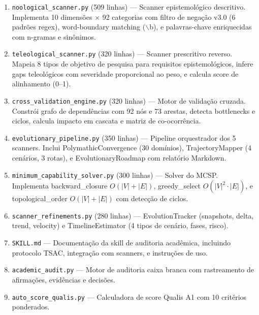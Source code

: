 \begin{enumerate}
  \item \texttt{noological\_scanner.py} (509 linhas) --- Scanner epistemológico descritivo. Implementa 10 dimensões $\times$ 92 categorias com filtro de negação v3.0 (6 padrões regex), word-boundary matching ($\backslash$b), e palavras-chave enriquecidas com n-gramas e sinônimos.
  \item \texttt{teleological\_scanner.py} (320 linhas) --- Scanner prescritivo reverso. Mapeia 8 tipos de objetivo de pesquisa para requisitos epistemológicos, infere gaps teleológicos com severidade proporcional ao peso, e calcula score de alinhamento (0--1).
  \item \texttt{cross\_validation\_engine.py} (320 linhas) --- Motor de validação cruzada. Constrói grafo de dependências com 92 nós e 73 arestas, detecta bottlenecks e ciclos, calcula impacto em cascata e matriz de co-ocorrência.
  \item \texttt{evolutionary\_pipeline.py} (350 linhas) --- Pipeline orquestrador dos 5 scanners. Inclui PolymathicConvergence (30 domínios), TrajectoryMapper (4 cenários, 3 rotas), e EvolutionaryRoadmap com relatório Markdown.
  \item \texttt{minimum\_capability\_solver.py} (300 linhas) --- Solver do MCSP. Implementa backward\_closure $O(|V|+|E|)$, greedy\_select $O(|V|^2 \cdot |E|)$, e topological\_order $O(|V|+|E|)$ com detecção de ciclos.
  \item \texttt{scanner\_refinements.py} (280 linhas) --- EvolutionTracker (snapshots, delta, trend, velocity) e TimelineEstimator (4 tipos de cenário, fases, risco).
  \item \texttt{SKILL.md} --- Documentação da skill de auditoria acadêmica, incluindo protocolo TSAC, integração com scanners, e instruções de uso.
  \item \texttt{academic\_audit.py} --- Motor de auditoria caixa branca com rastreamento de afirmações, evidências e decisões.
  \item \texttt{auto\_score\_qualis.py} --- Calculadora de score Qualis A1 com 10 critérios ponderados.
\end{enumerate}

\newpage
